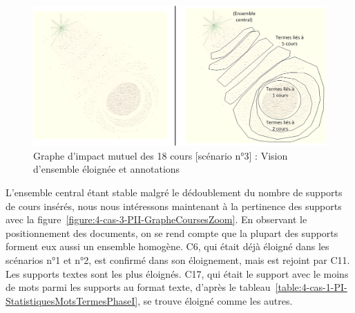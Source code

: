\begin{figure}[htb!]
\centering
\centerline{  %
\includegraphics[scale=0.8]{4-Experiences/images/cas-3/Graphe-Directe-Explications.png}
}
\caption{Graphe d'impact mutuel des 18 cours [scénario n°3] : Vision d'ensemble éloignée et annotations}
\label{figure:4-cas-3-PII-GrapheDezoom}
\end{figure}



L'ensemble central étant stable malgré le dédoublement du nombre de supports de cours insérés, nous nous intéressons maintenant à la pertinence des supports avec la figure~\ref{figure:4-cas-3-PII-GrapheCoursesZoom}.
En observant le positionnement des documents, on se rend compte que la plupart des supports forment eux aussi un ensemble homogène.
C6, qui était déjà éloigné dans les scénarios n°1 et n°2, est confirmé dans son éloignement, mais est rejoint par C11.
Les supports textes sont les plus éloignés.
C17, qui était le support avec le moins de mots parmi les supports au format texte, d'après le tableau~\ref{table:4-cas-1-PI-StatistiquesMotsTermesPhaseI}, se trouve éloigné comme les autres.


